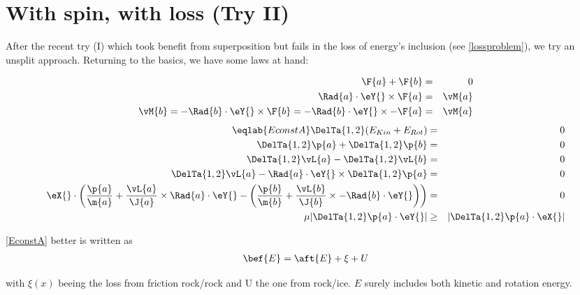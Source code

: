 
\section{With spin, with loss (Try II)}

After the recent try (I) which took benefit from superposition but fails in the
loss of energy's inclusion (see \ref{lossproblem}), we try an unsplit approach.
Returning to the basics, we have some laws at hand:

\begin{eqnarray}
\F{a} + \F{b} &=& 0 \\
\Rad{a}\cdot\eY{} \times \F{a} &=& \vM{a} \\
\vM{b} = -\Rad{b}\cdot\eY{} \times \F{b} = -\Rad{b}\cdot\eY{} \times -\F{a} &=& \vM{a}
\end{eqnarray}
\begin{eqnarray}
\eqlab{EconstA}\DelTa{1,2}( E_{Kin} + E_{Rot} ) &=& 0 \\
\DelTa{1,2}\p{a} + \DelTa{1,2}\p{b} &=& 0 \\
\DelTa{1,2}\vL{a} - \DelTa{1,2}\vL{b} &=& 0 \\
\DelTa{1,2}\vL{a} - \Rad{a}\cdot\eY{} \times \DelTa{1,2}\p{a} &=& 0 \\
\eX{} \cdot \left(
    \frac{\p{a}}{\m{a}} + \frac{\vL{a}}{\J{a}} \times  \Rad{a}\cdot\eY{} -
    \left(
    \frac{\p{b}}{\m{b}} + \frac{\vL{b}}{\J{b}} \times -\Rad{b}\cdot\eY{} 
    \right)
\right) &=& 0 \\
\mu|\DelTa{1,2}\p{a} \cdot\eY{} | &\ge& | \DelTa{1,2}\p{a} \cdot\eX{} |
\end{eqnarray}

\eqref{EconstA} better is written as
{%
\begin{eqnarray}
\bef{E} = \aft{E} + \xi + U
\end{eqnarray}}

with $ \xi(x) $ beeing the loss from friction rock/rock and U the one from
rock/ice. $ E $ surely includes both kinetic and rotation energy.

